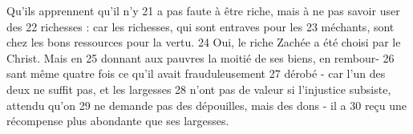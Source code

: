 Qu'ils apprennent qu'il n'y	 
21	 	a pas faute à être riche, mais à ne pas savoir user des	 
22	 	richesses : car les richesses, qui sont entraves pour les	 
23	 	méchants, sont chez les bons ressources pour la vertu.	 
24	 	Oui, le riche Zachée a été choisi par le Christ. Mais en	 
25	 	donnant aux pauvres la moitié de ses biens, en rembour-	 
26	 	sant même quatre fois ce qu'il avait frauduleusement	 
27	 	dérobé - car l'un des deux ne suffit pas, et les largesses	 
28	 	n'ont pas de valeur si l'injustice subsiste, attendu qu'on	 
29	 	ne demande pas des dépouilles, mais des dons - il a	 
30	 	reçu une récompense plus abondante que ses largesses.